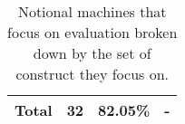 \begin{table}[h]
\begin{minipage}{0.48\textwidth}
\begin{tabular}{|l||r|r|l|}
\hline
\textbf{Total} & 32    & 82.05\%   & -   \\
\hline
\end{tabular}
\caption{Notional machines that focus on evaluation broken down by the set of construct they focus on.}
\label{tab:nm-classification-narrow-focus}
    \end{minipage}
\end{table}






